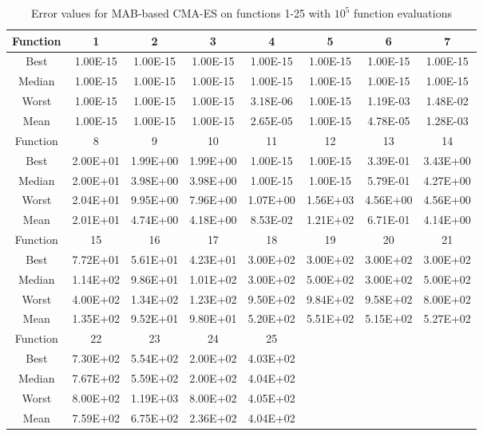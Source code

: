 \begin{table}[h]
\footnotesize
  \centering
\begin{tabular}{@{}cccccccc@{}}
\toprule
Function&1       &2       &3       &4       &5       &6       &7     \\ \midrule
Best    &1.00E-15&1.00E-15&1.00E-15&1.00E-15&1.00E-15&1.00E-15&1.00E-15 \\
Median  &1.00E-15&1.00E-15&1.00E-15&1.00E-15&1.00E-15&1.00E-15&1.00E-15\\
Worst   &1.00E-15&1.00E-15&1.00E-15&3.18E-06&1.00E-15&1.19E-03&1.48E-02\\
Mean    &1.00E-15&1.00E-15&1.00E-15&2.65E-05&1.00E-15&4.78E-05&1.28E-03\\\midrule
Function&8       &9       &10      &11      &12      &13      &14      \\\midrule
Best    &2.00E+01&1.99E+00&1.99E+00&1.00E-15&1.00E-15&3.39E-01&3.43E+00\\
Median  &2.00E+01&3.98E+00&3.98E+00&1.00E-15&1.00E-15&5.79E-01&4.27E+00 \\
Worst   &2.04E+01&9.95E+00&7.96E+00&1.07E+00&1.56E+03&4.56E+00&4.56E+00\\
Mean    &2.01E+01&4.74E+00&4.18E+00&8.53E-02&1.21E+02&6.71E-01&4.14E+00\\\midrule
Function&15      &16      &17      &18      &19      &20      &21\\\midrule
Best    &7.72E+01&5.61E+01&4.23E+01&3.00E+02&3.00E+02&3.00E+02&3.00E+02\\
Median  &1.14E+02&9.86E+01&1.01E+02&3.00E+02&5.00E+02&3.00E+02&5.00E+02\\
Worst   &4.00E+02&1.34E+02&1.23E+02&9.50E+02&9.84E+02&9.58E+02&8.00E+02\\
Mean    &1.35E+02&9.52E+01&9.80E+01&5.20E+02&5.51E+02&5.15E+02&5.27E+02\\\midrule
Function&22      &23      &24      &25&&&\\\midrule
Best    &7.30E+02&5.54E+02&2.00E+02&4.03E+02&&&\\
Median  &7.67E+02&5.59E+02&2.00E+02&4.04E+02&&&\\
Worst   &8.00E+02&1.19E+03&8.00E+02&4.05E+02&&&\\
Mean    &7.59E+02&6.75E+02&2.36E+02&4.04E+02&&&\\\bottomrule
\end{tabular}
\caption{Error values for MAB-based CMA-ES on functions 1-25 with $10^5$ function evaluations}
\label{table:errorMABcmaes}
\end{table}

